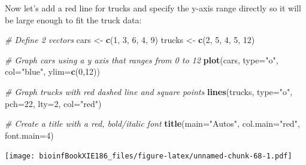 \documentclass[]{book}
\makeatletter
\newenvironment{Shaded}{\begin{snugshade}}{\end{snugshade}}
\newcommand{\KeywordTok}[1]{\textcolor[rgb]{0.13,0.29,0.53}{\textbf{#1}}}
\newcommand{\DataTypeTok}[1]{\textcolor[rgb]{0.13,0.29,0.53}{#1}}
\newcommand{\DecValTok}[1]{\textcolor[rgb]{0.00,0.00,0.81}{#1}}
\newcommand{\StringTok}[1]{\textcolor[rgb]{0.31,0.60,0.02}{#1}}
\newcommand{\CommentTok}[1]{\textcolor[rgb]{0.56,0.35,0.01}{\textit{#1}}}
\newcommand{\NormalTok}[1]{#1}
\newenvironment{kframe}{%
\medskip{}
\setlength{\fboxsep}{.8em}
 \def\at@end@of@kframe{}%
 \ifinner\ifhmode%
  \def\at@end@of@kframe{\end{minipage}}%
  \begin{minipage}{\columnwidth}%
 \fi\fi%
 \def\FrameCommand##1{\hskip\@totalleftmargin \hskip-\fboxsep
 \colorbox{shadecolor}{##1}\hskip-\fboxsep
     \hskip-\linewidth \hskip-\@totalleftmargin \hskip\columnwidth}%
 \MakeFramed {\advance\hsize-\width
   \@totalleftmargin\z@ \linewidth\hsize
   \@setminipage}}%
 {\par\unskip\endMakeFramed%
 \at@end@of@kframe}
\renewenvironment{Shaded}{\begin{kframe}}{\end{kframe}}
\theoremstyle{definition}
\theoremstyle{definition}
\theoremstyle{definition}
\theoremstyle{remark}
\makeatother
\begin{document}
Now let's add a red line for trucks and specify the y-axis range
directly so it will be large enough to fit the truck data:

\begin{Shaded}
\begin{Highlighting}[]
\CommentTok{# Define 2 vectors}
\NormalTok{cars <-}\StringTok{ }\KeywordTok{c}\NormalTok{(}\DecValTok{1}\NormalTok{, }\DecValTok{3}\NormalTok{, }\DecValTok{6}\NormalTok{, }\DecValTok{4}\NormalTok{, }\DecValTok{9}\NormalTok{)}
\NormalTok{trucks <-}\StringTok{ }\KeywordTok{c}\NormalTok{(}\DecValTok{2}\NormalTok{, }\DecValTok{5}\NormalTok{, }\DecValTok{4}\NormalTok{, }\DecValTok{5}\NormalTok{, }\DecValTok{12}\NormalTok{)}

\CommentTok{# Graph cars using a y axis that ranges from 0 to 12}
\KeywordTok{plot}\NormalTok{(cars, }\DataTypeTok{type=}\StringTok{"o"}\NormalTok{, }\DataTypeTok{col=}\StringTok{"blue"}\NormalTok{, }\DataTypeTok{ylim=}\KeywordTok{c}\NormalTok{(}\DecValTok{0}\NormalTok{,}\DecValTok{12}\NormalTok{))}

\CommentTok{# Graph trucks with red dashed line and square points}
\KeywordTok{lines}\NormalTok{(trucks, }\DataTypeTok{type=}\StringTok{"o"}\NormalTok{, }\DataTypeTok{pch=}\DecValTok{22}\NormalTok{, }\DataTypeTok{lty=}\DecValTok{2}\NormalTok{, }\DataTypeTok{col=}\StringTok{"red"}\NormalTok{)}

\CommentTok{# Create a title with a red, bold/italic font}
\KeywordTok{title}\NormalTok{(}\DataTypeTok{main=}\StringTok{"Autos"}\NormalTok{, }\DataTypeTok{col.main=}\StringTok{"red"}\NormalTok{, }\DataTypeTok{font.main=}\DecValTok{4}\NormalTok{)}
\end{Highlighting}
\end{Shaded}

\texttt{[image: bioinfBookXIE186\_files/figure-latex/unnamed-chunk-68-1.pdf]}


\end{document}

